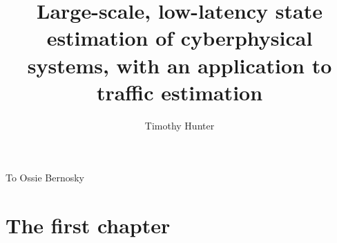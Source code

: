 \documentclass{ucbthesis}
\begin{document}

\title{Large-scale, low-latency state estimation of cyberphysical systems, with an application to traffic estimation}
\author{Timothy Hunter}




\maketitle
\approvalpage
\copyrightpage

% 

\begin{frontmatter}

\begin{dedication}
\null\vfil
\begin{center}
To Ossie Bernosky\\\vspace{12pt}
\end{center}
\vfil\null
\end{dedication}

\tableofcontents
\clearpage
\listoffigures
\clearpage
\listoftables

\begin{acknowledgements}

\end{acknowledgements}

\end{frontmatter}

\pagestyle{headings}



\chapter{The first chapter}






\end{document}
